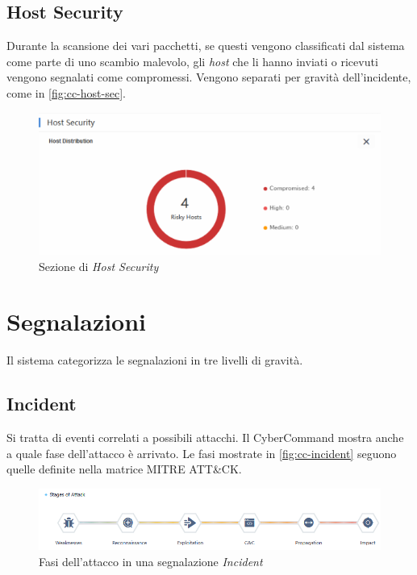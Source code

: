 \subsection{Host Security}

Durante la scansione dei vari pacchetti, se questi vengono classificati dal sistema come parte di uno scambio malevolo, gli \emph{host} che li hanno inviati o ricevuti vengono segnalati come compromessi. Vengono separati per gravità dell'incidente, come in \autoref{fig:cc-host-sec}.

\begin{figure}[!htbp]
    \centering
    \includegraphics[width=0.8\linewidth]{images/ndr/host-sec-number.png}
    \caption{Sezione di \emph{Host Security}}
    \label{fig:cc-host-sec}
\end{figure}

\section{Segnalazioni}

Il sistema categorizza le segnalazioni in tre livelli di gravità.

\subsection{Incident}

Si tratta di eventi correlati a possibili attacchi. Il CyberCommand mostra anche a quale fase dell'attacco è arrivato. Le fasi mostrate in \autoref{fig:cc-incident} seguono quelle definite nella matrice MITRE ATT\&CK\cite{site:mitre-attck}.

\begin{figure}[!htbp]
    \centering
    \includegraphics[width=\linewidth]{images/ndr/attack-stage.png}
    \caption{Fasi dell'attacco in una segnalazione \emph{Incident}}
    \label{fig:cc-incident}
\end{figure}

